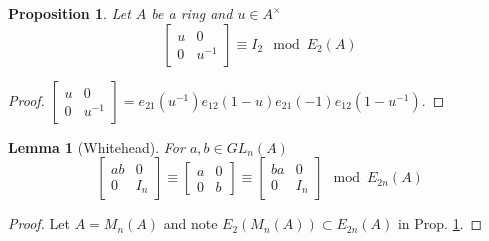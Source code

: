 \documentclass[12pt]{article}
\numberwithin{equation}{section}
\newcounter{dummy} \numberwithin{dummy}{section}
\newtheorem{lemma}[dummy]{Lemma}
\newtheorem{proposition}[dummy]{Proposition}
\begin{document}
	\begin{proposition}\label{whiteheadsimple}
		Let $A$ be a ring and $u \in A^\times$
		\[ {\displaystyle {\begin{bmatrix}u&0\\0&u^{-1}\end{bmatrix}}} \equiv I_2 \mod E_2(A)\]
	\end{proposition}
	\begin{proof}
		${\displaystyle {\begin{bmatrix}u&0\\0&u^{-1}\end{bmatrix}}=e_{21}(u^{-1})e_{12}(1-u)e_{21}(-1)e_{12}(1-u^{-1}).}$
	\end{proof}
\begin{lemma}[Whitehead]\label{whiteheadmain}
	For $a,b \in GL_n(A)$ \[ \begin{bmatrix}
		ab & 0 \\ 0 & I_n
	\end{bmatrix} \equiv \begin{bmatrix} a & 0 \\ 0 & b
	\end{bmatrix} \equiv \begin{bmatrix}
		ba & 0 \\ 0 & I_n 
	\end{bmatrix} \mod E_{2n} (A)\]
\end{lemma}
\begin{proof}
	Let $A=M_n(A)$ and note $E_2(M_n(A) ) \subset E_{2n}(A)$ in Prop. \ref{whiteheadsimple}.
\end{proof}
	
\end{document}
